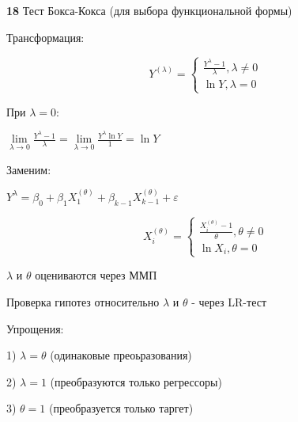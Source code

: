\documentclass[12pt]{article}
\renewcommand{\epsilon}{\varepsilon}
\begin{document}
	
\textbf{18} Тест Бокса-Кокса (для выбора функциональной формы)

Трансформация:

\begin{equation*}
Y^{(\lambda)} = 
\begin{cases}
\frac{Y^{\lambda} - 1}{\lambda}, \lambda \neq 0\\
\ln{Y}, \lambda = 0
\end{cases}
\end{equation*} 

При $\lambda = 0$:  

$\lim\limits_{\lambda \to 0} \frac{Y^{\lambda} - 1}{\lambda} = \lim\limits_{\lambda \to 0} \frac{Y^{\lambda}\ln{Y}}{1} = \ln{Y}$

Заменим:

$Y^{\lambda} = \beta_{0} + \beta_{1}X_{1}^{(\theta)} + \beta_{k-1}X_{k-1}^{(\theta)} + \epsilon$
	
\begin{equation*}
X_{i}^{(\theta)} = 
\begin{cases}
\frac{X_{i}^{(\theta)} - 1}{\theta}, \theta \neq 0\\
\ln{X_{i}}, \theta = 0
\end{cases}
\end{equation*} 

$\lambda$ и $\theta$ оцениваются через ММП

Проверка гипотез относительно $\lambda$ и $\theta$ - через LR-тест

Упрощения:

1) $\lambda = \theta$ (одинаковые преоьразования)

2) $\lambda = 1$ (преобразуются только регрессоры)

3) $\theta = 1$ (преобразуется только таргет)
	
	
	
\end{document}
